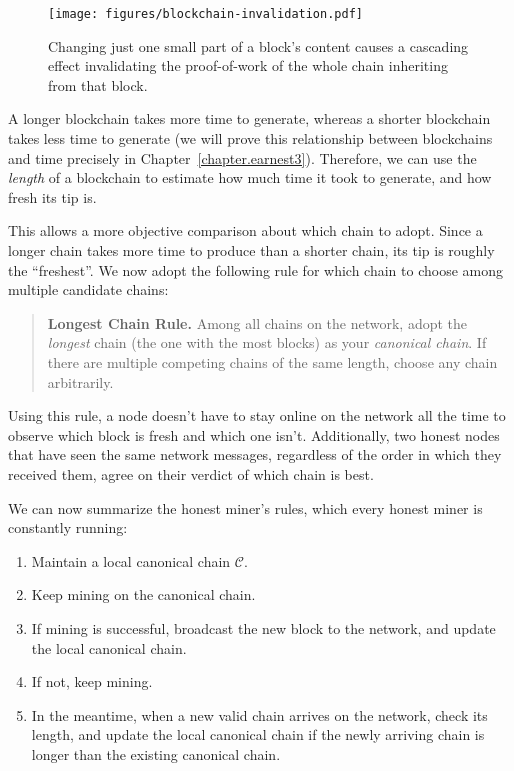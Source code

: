 \begin{figure}[h]
    \centering
    \texttt{[image: figures/blockchain-invalidation.pdf]}
    \caption{Changing just one small part of a block's content causes a cascading effect invalidating the proof-of-work of the whole chain inheriting from that block.}
    \label{fig.blockchain-invalidation}
\end{figure}

A longer blockchain takes more time to generate, whereas a shorter blockchain takes less time
to generate (we will prove this relationship between blockchains and time precisely in
Chapter~\ref{chapter.earnest3}). Therefore, we can use the \emph{length} of a blockchain
to estimate how much time it took to generate, and how fresh its tip is.

This allows a more objective comparison about which chain to adopt. Since a longer chain takes
more time to produce than a shorter chain, its tip is roughly the ``freshest''.
We now adopt the following rule for which chain to choose among multiple candidate
chains:

\begin{quote}
    \textbf{Longest Chain Rule. }
    Among all chains on the network, adopt the \emph{longest} chain (the one with the most
    blocks) as your \emph{canonical chain}. If there are multiple
    competing chains of the same length, choose any chain arbitrarily.
\end{quote}

Using this rule, a node doesn't have to stay online on the network all the time to observe
which block is fresh and which one isn't. Additionally, two honest nodes that have seen the
same network messages, regardless of the order in which they received them, agree on their
verdict of which chain is best.

We can now summarize the honest miner's rules, which every honest miner is constantly running:

\begin{enumerate}
  \item Maintain a local canonical chain $\mathcal{C}$.
  \item Keep mining on the canonical chain.
  \item If mining is successful, broadcast the new block to the network, and update the local canonical chain.
  \item If not, keep mining.
  \item In the meantime, when a new valid chain arrives on the network,
        check its length, and update the local canonical chain if the
        newly arriving chain is longer than the existing canonical chain.
\end{enumerate}

